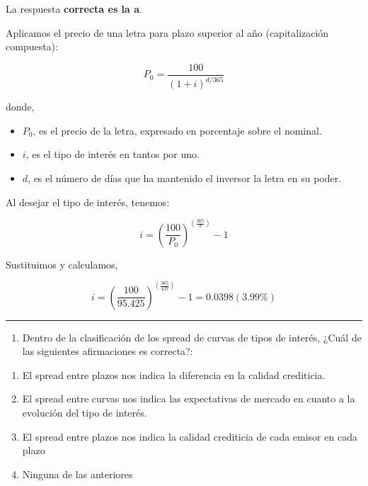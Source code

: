 \documentclass[
  letterpaper,
  DIV=11,
  numbers=noendperiod]{scrreprt}
\providecommand{\tightlist}{%
  \setlength{\itemsep}{0pt}\setlength{\parskip}{0pt}}\usepackage{longtable,booktabs,array}
\begin{document}
\begin{tcolorbox}
\begin{tcolorbox}[enhanced jigsaw, toprule=.15mm, left=2mm, arc=.35mm, breakable, bottomrule=.15mm, opacityback=0, rightrule=.15mm, leftrule=.75mm, colframe=quarto-callout-note-color-frame, colback=white]
\begin{minipage}[t]{5.5mm}
\textcolor{quarto-callout-note-color}{\faInfo}
\end{minipage}%
\begin{minipage}[t]{\textwidth - 5.5mm}

La respuesta \textbf{correcta es la a}.

Aplicamos el precio de una letra para plazo superior al año
(capitalización compuesta):

\[P_0=\frac{100}{(1+i)^{d/365}}\]

donde,

\begin{itemize}
\item
  \(P_0\), es el precio de la letra, expresado en porcentaje sobre el
  nominal.
\item
  \(i\), es el tipo de interés en tantos por uno.
\item
  \(d\), es el número de días que ha mantenido el inversor la letra en
  su poder.
\end{itemize}

Al desejar el tipo de interés, tenemos:

\[i=\left(\frac{100}{P_0}\right)^{\left(\frac{365}{d}\right) }-1\]

Sustituimos y calculamos,

\[i=\left(\frac{100}{95.425}\right)^{\left(\frac{365}{437}\right) }-1=0.0398(3.99\%)\]

\end{minipage}%
\end{tcolorbox}

\begin{center}\rule{0.5\linewidth}{0.5pt}\end{center}

\begin{enumerate}
\def\labelenumi{\arabic{enumi}.}
\setcounter{enumi}{14}
\tightlist
\item
  Dentro de la clasificación de los spread de curvas de tipos de
  interés, ¿Cuál de las siguientes afirmaciones es correcta?:
\end{enumerate}

\begin{enumerate}
\def\labelenumi{\alph{enumi}.}
\item
  El spread entre plazos nos indica la diferencia en la calidad
  crediticia.
\item
  El spread entre curvas nos indica las expectativas de mercado en
  cuanto a la evolución del tipo de interés.
\item
  El spread entre plazos nos indica la calidad crediticia de cada emisor
  en cada plazo
\item
  Ninguna de las anteriores
\end{enumerate}


\end{tcolorbox}
\end{document}
